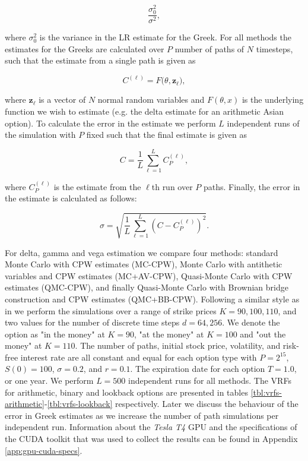 \begin{equation*}
    \frac{\sigma^2_0}{\sigma^2},
\end{equation*}

where $\sigma^2_0$ is the variance in the LR estimate for the Greek. For all methods the estimates for the Greeks are calculated over $P$ number of paths of $N$ timesteps, such that the estimate from a single path is given as

\begin{equation*}
    C^{(\ell)} = {F(\theta,\boldsymbol{z}_\ell}),
\end{equation*}

where $\boldsymbol{z}_\ell$ is a vector of $N$ normal random variables and $F(\theta, x)$ is the underlying function we wish to estimate (e.g. the delta estimate for an arithmetic Asian option). To calculate the error in the estimate we perform $L$ independent runs of the simulation with $P$ fixed such that the final estimate is given as

\begin{equation*}
    C = \frac{1}{L} \sum_{\ell=1}^{L} C_P^{(\ell)},
\end{equation*}

where $C_P^{(\ell)}$ is the estimate from the $\ell$th run over $P$ paths. Finally, the error in the estimate is calculated as follows:

\begin{equation*}
    \sigma = \sqrt{\frac{1}{L} \sum_{\ell=1}^{L} {(C - C_P^{(\ell)})}^2}.
\end{equation*}

For delta, gamma and vega estimation we compare four methods: standard Monte Carlo with CPW estimates (MC-CPW), Monte Carlo with antithetic variables and CPW estimates (MC+AV-CPW), Quasi-Monte Carlo with CPW estimates (QMC-CPW), and finally Quasi-Monte Carlo with Brownian bridge construction and CPW estimates (QMC+BB-CPW). Following a similar style as in \cite{ZhangConditionalQuasiMonteCarloMethod} we perform the simulations over a range of strike prices $K=90,100,110$, and two values for the number of discrete time steps $d=64,256$. We denote the option as "in the money" at $K=90$, "at the money" at $K=100$ and "out the money" at $K=110$. The number of paths, initial stock price, volatility, and risk-free interest rate are all constant and equal for each option type with $P = 2^{15}$,  $S(0) = 100$, $\sigma = 0.2$, and $r = 0.1$. The expiration date for each option $T = 1.0$, or one year. We perform $L=500$ independent runs for all methods. The VRFs for arithmetic, binary and lookback options are presented in tables \ref{tbl:vrfs-arithmetic}-\ref{tbl:vrfs-lookback} respectively. Later we discuss the behaviour of the error in Greek estimates as we increase the number of path simulations per independent run. Information about the \textit{Tesla T4} GPU and the specifications of the CUDA toolkit that was used to collect the results can be found in Appendix \ref{app:gpu-cuda-specs}.

